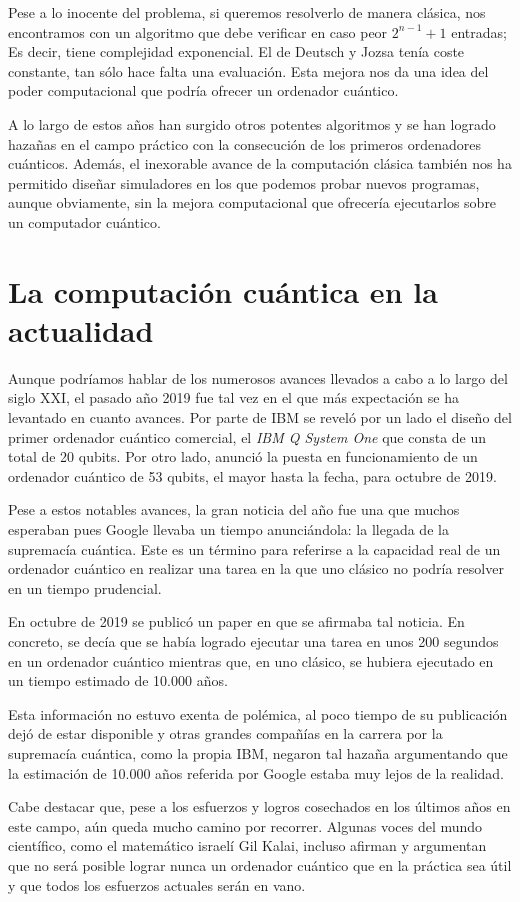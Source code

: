 Pese a lo inocente del problema, si queremos resolverlo de manera clásica, nos encontramos con un algoritmo que debe verificar en caso peor $2^{n-1}+1$ entradas; Es decir, tiene complejidad exponencial. El de Deutsch y Jozsa tenía coste constante, tan sólo hace falta una evaluación. Esta mejora nos da una idea del poder computacional que podría ofrecer un ordenador cuántico.

A lo largo de estos años han surgido otros potentes algoritmos y se han logrado hazañas en el campo práctico con la consecución de los primeros ordenadores cuánticos. Además, el inexorable avance de la computación clásica también nos ha permitido diseñar simuladores en los que podemos probar nuevos programas, aunque obviamente, sin la mejora computacional que ofrecería ejecutarlos sobre un computador cuántico.

\section{La computación cuántica en la actualidad}
Aunque podríamos hablar de los numerosos avances llevados a cabo a lo largo del siglo XXI, el pasado año 2019 fue tal vez en el que más expectación se ha levantado en cuanto avances. Por parte de IBM se reveló por un lado el diseño del primer ordenador cuántico comercial, el \textit{IBM Q System One} que consta de un total de 20 qubits. Por otro lado, anunció la puesta en funcionamiento de un ordenador cuántico de 53 qubits, el mayor hasta la fecha, para octubre de 2019.

Pese a estos notables avances, la gran noticia del año fue una que muchos esperaban pues Google llevaba un tiempo anunciándola: la llegada de la supremacía cuántica. Este es un término para referirse a la capacidad real de un ordenador cuántico en realizar una tarea en la que uno clásico no podría resolver en un tiempo prudencial.

En octubre de 2019 se publicó un paper\cite{arute2019quantum} en que se afirmaba tal noticia. En concreto, se decía que se había logrado ejecutar una tarea en unos 200 segundos en un ordenador cuántico mientras que, en uno clásico, se hubiera ejecutado en un tiempo estimado de 10.000 años.

Esta información no estuvo exenta de polémica, al poco tiempo de su publicación dejó de estar disponible y otras grandes compañías en la carrera por la supremacía cuántica, como la propia IBM, negaron tal hazaña argumentando que la estimación de 10.000 años referida por Google estaba muy lejos de la realidad.

Cabe destacar que, pese a los esfuerzos y logros cosechados en los últimos años en este campo, aún queda mucho camino por recorrer. Algunas voces del mundo científico, como el matemático israelí Gil Kalai, incluso afirman y argumentan que no será posible lograr nunca un ordenador cuántico que en la práctica sea útil y que todos los esfuerzos actuales serán en vano\cite{kalai2011quantum}.